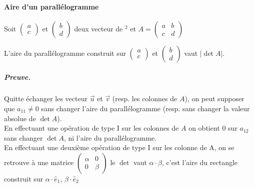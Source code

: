 \paragraph{Aire d'un parallélogramme}
Soit $\begin{pmatrix} a \\ c \end{pmatrix}$ et $\begin{pmatrix} b \\ d \end{pmatrix}$ deux vecteur de \R$^2$ et $A = \begin{pmatrix}
    a & b \\
    c & d
\end{pmatrix}$
\begin{theorem}
    L'aire du parallélogramme construit sur $\begin{pmatrix} a \\ c \end{pmatrix}$ et $\begin{pmatrix} b \\ d \end{pmatrix}$ vaut $|\det A|$.
\end{theorem}

\subparagraph{Preuve.}
Quitte  échanger les vecteur $\vec{u}$ et $\vec{v}$ (resp. les colonnes de $A$), on peut supposer que $a_{11} \neq 0$ sans changer l'aire du parallélogramme (resp. sans changer la valeur absolue de $\det A$).
\\
En effectuant une opération de type I sur les colonnes de $A$ on obtient $0$ sur $a_{12}$ sans changer $\det A$, ni l'aire du parallélogramme.
\\
En effectuant une deuxième opération de type I sur les colonne de A, on se retrouve à une matrice $\begin{pmatrix}
    \alpha & 0\\
    0 & \beta
\end{pmatrix}$ le $\det$ vaut $\alpha \cdot \beta$, c'est l'aire du rectangle construit sur $\alpha \cdot \hat{e}_1$, $\beta\cdot\hat{e}_2$

